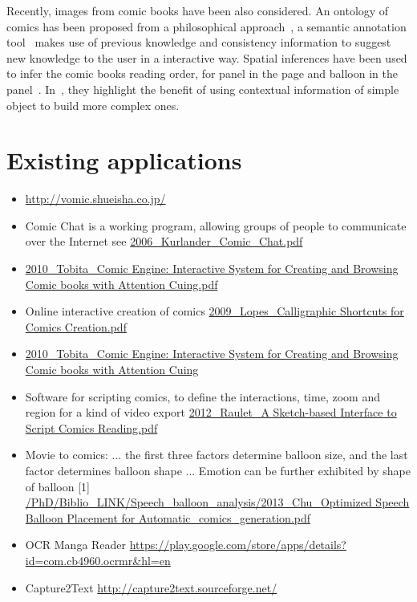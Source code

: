 
Recently, images from comic books have been also considered.
An ontology of comics has been proposed from a philosophical approach~\cite{Aaron2011}, a semantic annotation tool~\cite{Hermann2012Guided} makes use of previous knowledge and consistency information to suggest new knowledge to the user in a interactive way.
Spatial inferences have been used to infer the comic books reading order, for panel in the page and balloon in the panel~\cite{Guerin2012Ontologies}. 
In~\cite{Sciascio2011Structured}, they highlight the benefit of using contextual information of simple object to build more complex ones.


\section{Existing applications}
\label{sec:sota:applications}

\begin{itemize}
	\item \url{http://vomic.shueisha.co.jp/}
	\item Comic Chat is a working program, allowing groups of people to communicate over the Internet see \url{2006_Kurlander_Comic_Chat.pdf}
	\item \url{2010_Tobita_Comic Engine: Interactive System for Creating and Browsing Comic books with Attention Cuing.pdf}
	\item Online interactive creation of comics \url{2009_Lopes_Calligraphic Shortcuts for Comics Creation.pdf}
	\item \url{2010_Tobita_Comic Engine: Interactive System for Creating and Browsing Comic books with Attention Cuing}
	\item Software for scripting comics, to define the interactions, time, zoom and region for a kind of video export \url{2012_Raulet_A Sketch-based Interface to Script Comics Reading.pdf}
	\item Movie to comics: ... the first three factors determine balloon size, and the last factor determines balloon shape ... Emotion can be further exhibited by shape of balloon [1] \url{/PhD/Biblio_LINK/Speech_balloon_analysis/2013_Chu_Optimized Speech Balloon Placement for Automatic_comics_generation.pdf}
	\item OCR Manga Reader \url{https://play.google.com/store/apps/details?id=com.cb4960.ocrmr&hl=en}
	\item Capture2Text \url{http://capture2text.sourceforge.net/}
\end{itemize}

